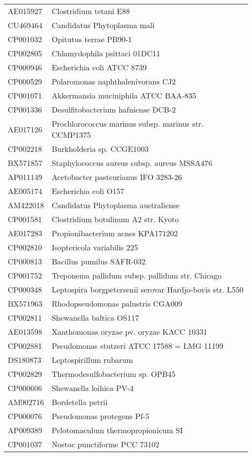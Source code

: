 \begin{longtable}{ll}
AE015927 & Clostridium tetani E88\\
CU469464 & Candidatus Phytoplasma mali\\
CP001032 & Opitutus terrae PB90-1\\
CP002805 & Chlamydophila psittaci 01DC11\\
CP000946 & Escherichia coli ATCC 8739\\
CP000529 & Polaromonas naphthalenivorans CJ2\\
CP001071 & Akkermansia muciniphila ATCC BAA-835\\
CP001336 & Desulfitobacterium hafniense DCB-2\\
AE017126 & Prochlorococcus marinus subsp. marinus str. CCMP1375\\
CP002218 & Burkholderia sp. CCGE1003\\
BX571857 & Staphylococcus aureus subsp. aureus MSSA476\\
AP011149 & Acetobacter pasteurianus IFO 3283-26\\
AE005174 & Escherichia coli O157\\
AM422018 & Candidatus Phytoplasma australiense\\
CP001581 & Clostridium botulinum A2 str. Kyoto\\
AE017283 & Propionibacterium acnes KPA171202\\
CP002810 & Isoptericola variabilis 225\\
CP000813 & Bacillus pumilus SAFR-032\\
CP001752 & Treponema pallidum subsp. pallidum str. Chicago\\
CP000348 & Leptospira borgpetersenii serovar Hardjo-bovis str. L550\\
BX571963 & Rhodopseudomonas palustris CGA009\\
CP002811 & Shewanella baltica OS117\\
AE013598 & Xanthomonas oryzae pv. oryzae KACC 10331\\
CP002881 & Pseudomonas stutzeri ATCC 17588 = LMG 11199\\
DS180873 & Leptospirillum rubarum\\
CP002829 & Thermodesulfobacterium sp. OPB45\\
CP000606 & Shewanella loihica PV-4\\
AM902716 & Bordetella petrii\\
CP000076 & Pseudomonas protegens Pf-5\\
AP009389 & Pelotomaculum thermopropionicum SI\\
CP001037 & Nostoc punctiforme PCC 73102\\

\end{longtable}
